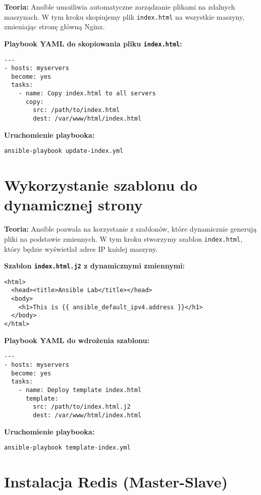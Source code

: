 \documentclass{article}
\begin{document}
\textbf{Teoria:}  
Ansible umożliwia automatyczne zarządzanie plikami na zdalnych maszynach. W tym kroku skopiujemy plik \texttt{index.html} na wszystkie maszyny, zmieniając stronę główną Nginx.

\textbf{Playbook YAML do skopiowania pliku \texttt{index.html}:}

\noindent\begin{lstlisting}
---
- hosts: myservers
  become: yes
  tasks:
    - name: Copy index.html to all servers
      copy:
        src: /path/to/index.html
        dest: /var/www/html/index.html
\end{lstlisting}

\textbf{Uruchomienie playbooka:}

\noindent\begin{lstlisting}
ansible-playbook update-index.yml
\end{lstlisting}

\section{Wykorzystanie szablonu do dynamicznej strony}

\textbf{Teoria:}  
Ansible pozwala na korzystanie z szablonów, które dynamicznie generują pliki na podstawie zmiennych. W tym kroku stworzymy szablon \texttt{index.html}, który będzie wyświetlał adres IP każdej maszyny.

\textbf{Szablon \texttt{index.html.j2} z dynamicznymi zmiennymi:}

\noindent\begin{lstlisting}
<html>
  <head><title>Ansible Lab</title></head>
  <body>
    <h1>This is {{ ansible_default_ipv4.address }}</h1>
  </body>
</html>
\end{lstlisting}

\textbf{Playbook YAML do wdrożenia szablonu:}

\noindent\begin{lstlisting}
---
- hosts: myservers
  become: yes
  tasks:
    - name: Deploy template index.html
      template:
        src: /path/to/index.html.j2
        dest: /var/www/html/index.html
\end{lstlisting}

\textbf{Uruchomienie playbooka:}

\noindent\begin{lstlisting}
ansible-playbook template-index.yml
\end{lstlisting}

\section{Instalacja Redis (Master-Slave)}
\end{document}
